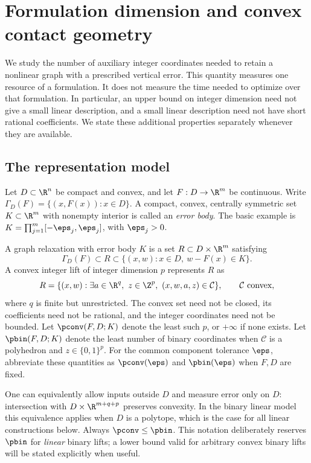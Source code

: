 \section{Formulation dimension and convex contact geometry}\label{sec:foundations}

We study the number of auxiliary integer coordinates needed to retain a
nonlinear graph with a prescribed vertical error. This quantity measures
one resource of a formulation. It does not measure the time needed to
optimize over that formulation. In particular, an upper bound on integer
dimension need not give a small linear description, and a small linear
description need not have short rational coefficients. We state these
additional properties separately whenever they are available.

\subsection{The representation model}

Let $D\subset\R^n$ be compact and convex, and let $F:D\to\R^m$ be
continuous. Write $\Gamma_D(F)=\{(x,F(x)):x\in D\}$. A compact, convex,
centrally symmetric set $K\subset\R^m$ with nonempty interior is called
an \emph{error body}. The basic example is
$K=\prod_{j=1}^m[-\eps_j,\eps_j]$, with $\eps_j>0$.

\begin{definition}\label{def:dimension}
A graph relaxation with error body $K$ is a set $R\subset D\times\R^m$
satisfying
\[
 \Gamma_D(F)\subset R\subset
 \{(x,w):x\in D,\ w-F(x)\in K\}.
\]
A convex integer lift of integer dimension $p$ represents $R$ as
\begin{equation}\label{eq:convex-lift}
 R=\{(x,w):\exists a\in\R^q,\ z\in\Z^p,
                  \ (x,w,a,z)\in\mathcal C\},
 \qquad \mathcal C\text{ convex},
\end{equation}
where $q$ is finite but unrestricted. The convex set need not be closed,
its coefficients need not be rational, and the integer coordinates need
not be bounded. Let $\pconv(F,D;K)$ denote the least such $p$, or $+\infty$
if none exists. Let $\pbin(F,D;K)$ denote the least number of binary
coordinates when $\mathcal C$ is a polyhedron and $z\in\{0,1\}^p$.
For the common component tolerance $\eps$, abbreviate these quantities
as $\pconv(\eps)$ and $\pbin(\eps)$ when $F,D$ are fixed.
\end{definition}

One can equivalently allow inputs outside $D$ and measure error only on
$D$: intersection with $D\times\R^{m+q+p}$ preserves convexity. In the
binary linear model this equivalence applies when $D$ is a polytope,
which is the case for all linear constructions below. Always
$\pconv\le\pbin$. This notation deliberately reserves $\pbin$ for
\emph{linear} binary lifts; a lower bound valid for arbitrary convex
binary lifts will be stated explicitly when useful.

